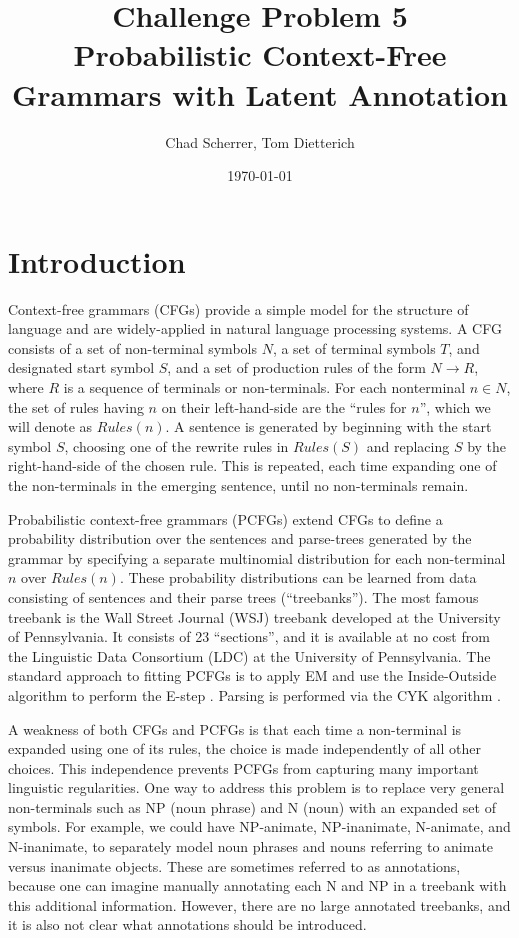 \documentclass[english]{article}
\begin{document}
\title{Challenge Problem 5\\
Probabilistic Context-Free Grammars with Latent Annotation}

\author{Chad Scherrer, Tom Dietterich}

\date{\today}

\maketitle

\section{Introduction}
Context-free grammars (CFGs) provide a simple model for the structure of language and are widely-applied in natural language processing systems. A CFG consists of a set of non-terminal symbols $N$, a set of terminal symbols $T$, and designated start symbol $S$, and a set of production rules of the form $N \rightarrow R$, where $R$ is a sequence of terminals or non-terminals. For each nonterminal $n \in N$, the set of rules having $n$ on their left-hand-side are the ``rules for $n$'', which we will denote as $Rules(n)$.  A sentence is generated by beginning with the start symbol $S$, choosing one of the rewrite rules in $Rules(S)$ and replacing $S$ by the right-hand-side of the chosen rule. This is repeated, each time expanding one of the non-terminals in the emerging sentence, until no non-terminals remain.

Probabilistic context-free grammars (PCFGs) extend CFGs to define a probability distribution over the sentences and parse-trees generated by the grammar by specifying a separate multinomial distribution for each non-terminal $n$ over $Rules(n)$.  These probability distributions can be learned from data consisting of sentences and their parse trees (``treebanks'').  The most famous treebank is the Wall Street Journal (WSJ) treebank developed at the University of Pennsylvania. It consists of 23 ``sections'', and it is available at no cost from the Linguistic Data Consortium (LDC) at the University of Pennsylvania. The standard approach to fitting PCFGs is to apply EM and use the Inside-Outside algorithm to perform the E-step \cite{baker1979,collins:io}. Parsing is performed via the CYK algorithm \cite{Cocke1970}. 

A weakness of both CFGs and PCFGs is that each time a non-terminal is expanded using one of its rules, the choice is made independently of all other choices. This independence prevents PCFGs from capturing many important linguistic regularities. One way to address this problem is to replace very general non-terminals such as NP (noun phrase) and N (noun) with an expanded set of symbols.  For example, we could have NP-animate, NP-inanimate, N-animate, and N-inanimate, to separately model noun phrases and nouns referring to animate versus inanimate objects. These are sometimes referred to as annotations, because one can imagine manually annotating each N and NP in a treebank with this additional information.  However, there are no large annotated treebanks, and it is also not clear what annotations should be introduced.
\end{document}

